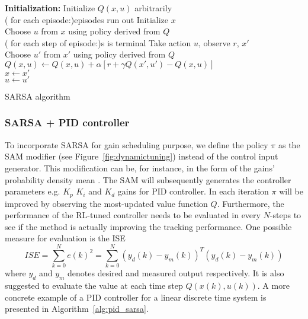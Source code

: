 	\begin{algorithm}[H]
		\textbf{Initialization:} Initialize $ Q(x,u) $ arbitrarily\\
		\Repeat( for each episode:){episodes run out}{
			Initialize $ x $ \\
			Choose $ u $ from $ x $ using policy derived from $ Q $ \\
			\Repeat ( for each step of episode:){s is terminal}{
				Take action $ u $, observe $ r $, $ x' $ \\
				Choose $ u' $ from $ x' $ using policy derived from $ Q $ \\
				$ Q(x,u) \leftarrow Q(x,u) + \alpha[r+\gamma Q(x',u')-Q(x,u)] $	\\
				$ x \leftarrow  x' $\\
				$ u \leftarrow  u' $
			}
		} 		
		\label{alg:sarsa}
		\caption{\acs {SARSA} algorithm}
	\end{algorithm}
	
	\subsubsection{\acs{SARSA} + \acs{PID} controller}
	To incorporate \acs{SARSA} for gain scheduling purpose, we define the policy $\pi$ as the \acs {SAM} modifier (see Figure~\ref{fig:dynamictuning}) instead of the control input generator. This modification can be, for instance, in the form of the gains' probability density mean \cite{Sedighizadeh2008}. The \acs {SAM} will subsequently generates the controller parameters e.g. $ K_p $ $ K_i $ and $ K_d $ gains for \acs{PID} controller. In each iteration $\pi$ will be improved by observing the most-updated value function $Q$. Furthermore, the performance of the \acs {RL}-tuned controller needs to be evaluated in every $ N $-steps to see if the method is actually improving the tracking performance. One possible measure for evaluation is the \ac {ISE}
	\begin{equation}
	ISE = \sum_{k=0}^{N}e(k)^2 = \sum_{k=0}^{N}(y_d(k) - y_m(k))^T(y_d(k) - y_m(k))
	\end{equation}
	where $y_d$ and $y_m$ denotes desired and measured output respectively. It is also suggested to evaluate the value at each time step $Q(x(k), u(k))$. A more concrete example of a \acs{PID} controller for a linear discrete time system is presented in Algorithm~\ref{alg:pid_sarsa}.
	
